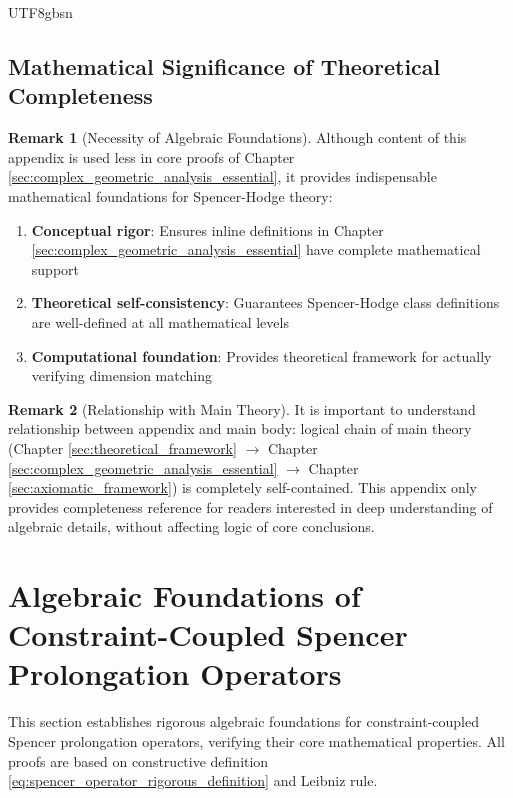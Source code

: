 \documentclass[a4paper,12pt]{extarticle}
\theoremstyle{definition}
\newtheorem{remark}{Remark}[section]
\begin{document}
\begin{CJK}{UTF8}{gbsn}
\subsection{Mathematical Significance of Theoretical Completeness}
\label{appendix:subsec_mathematical_completeness}

\begin{remark}[Necessity of Algebraic Foundations]
\label{appendix:rem_necessity}
Although content of this appendix is used less in core proofs of Chapter \ref{sec:complex_geometric_analysis_essential}, it provides indispensable mathematical foundations for Spencer-Hodge theory:

\begin{enumerate}
    \item \textbf{Conceptual rigor}: Ensures inline definitions in Chapter \ref{sec:complex_geometric_analysis_essential} have complete mathematical support
    \item \textbf{Theoretical self-consistency}: Guarantees Spencer-Hodge class definitions are well-defined at all mathematical levels
    \item \textbf{Computational foundation}: Provides theoretical framework for actually verifying dimension matching
\end{enumerate}
\end{remark}

\begin{remark}[Relationship with Main Theory]
\label{appendix:rem_relation_main}
It is important to understand relationship between appendix and main body: logical chain of main theory (Chapter \ref{sec:theoretical_framework} $\to$ Chapter \ref{sec:complex_geometric_analysis_essential} $\to$ Chapter \ref{sec:axiomatic_framework}) is completely self-contained. This appendix only provides completeness reference for readers interested in deep understanding of algebraic details, without affecting logic of core conclusions.
\end{remark}

\section{Algebraic Foundations of Constraint-Coupled Spencer Prolongation Operators}
\label{appendix:spencer_operator_foundation}

This section establishes rigorous algebraic foundations for constraint-coupled Spencer prolongation operators, verifying their core mathematical properties. All proofs are based on constructive definition \eqref{eq:spencer_operator_rigorous_definition} and Leibniz rule.


\end{CJK}
\end{document}
